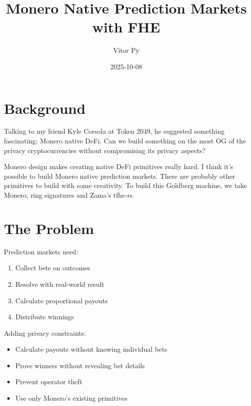 \documentclass{article}
\title{Monero Native Prediction Markets with FHE}
\author{Vitor Py}
\date{2025-10-08}
\begin{document}

\maketitle

\section{Background}

Talking to my friend Kyle Corsola at Token 2049, he suggested something fascinating: Monero native DeFi. Can we build something on the most OG of the privacy cryptocurrencies without compromising its privacy aspects?

Monero design makes creating native DeFi primitives really hard. I think it's possible to build Monero native prediction markets. There are probably other primitives to build with some creativity. To build this Goldberg machine, we take Monero, ring signatures and Zama's tfhe-rs.

\section{The Problem}

Prediction markets need:

\begin{enumerate}
\item Collect bets on outcomes

\item Resolve with real-world result

\item Calculate proportional payouts

\item Distribute winnings

\end{enumerate}

Adding privacy constraints:

\begin{itemize}
\item Calculate payouts without knowing individual bets

\item Prove winners without revealing bet details

\item Prevent operator theft

\item Use only Monero's existing primitives

\end{itemize}
\end{document}
